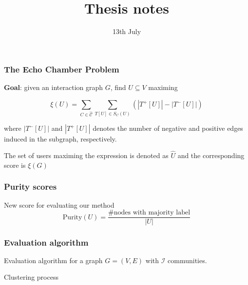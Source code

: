 \documentclass{beamer}
\title{Thesis notes}
\date{13th July}
\begin{document}
\frame{\titlepage}



\begin{frame}[c]
    \frametitle{The Echo Chamber Problem}
    \textbf{Goal}: given an interaction graph $G$, find $U \subseteq V$ maximing

    \begin{equation}
        \xi (U) = \sum^{}_{C \in \hat{\mathcal{C}} } \sum^{}_{T[U] \in S_C (U)}
        (| T^{+} [U] | - | T^{-} [U] |)
    \end{equation}

    where $| T^{-} [U] |$ and $| T^{+} [U] |$ denotes the number of negative
    and positive edges induced in the subgraph, respectively.

    \bigskip

    The set of users maximing the expression is denoted as $\hat{U}$ and the
    corresponding score is $\xi(G)$
\end{frame}

\begin{frame}[c]
    \frametitle{Purity scores}
    New score for evaluating our method
    \begin{equation}
        \text{Purity}(U) = \frac{\text{\# nodes with majority label}}{|U|} 
    \end{equation}
    
\end{frame}

\begin{frame}[c]
    \frametitle{Evaluation algorithm}

    Evaluation algorithm for a graph $G = (V, E)$ with $\mathcal{I} $
    communities.
    \bigskip

    \begin{algorithm}[H]
	\SetAlgoLined


	\caption{Clustering process}
	\label{alg:clustering_process}
\end{algorithm}
    
\end{frame}
\end{document}
